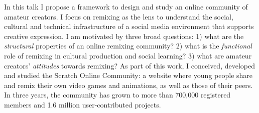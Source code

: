


\setcounter{savepage}{\thepage}
\begin{abstractpage}
\setlength{\parskip}{0pt} %
\begin{spacing}{1}
In this talk I propose a framework to design and study an online community of amateur creators.
I focus on remixing as the lens to understand the social, cultural and technical infrastructure of a social media environment that supports creative expression.
I am motivated by three broad questions:
1) what are the \emph{structural} properties of an online remixing community?
2) what is the \emph{functional} role of remixing in cultural production and social learning?
3) what are amateur creators' \emph{attitudes} towards remixing?
As part of this work, I conceived, developed and studied the Scratch Online Community: a website where young people share and remix their own video games and animations, as well as those of their peers.
In three years, the community has grown to more than 700,000 registered members and 1.6 million user-contributed projects.
\end{spacing}
\setlength{\parskip}{11pt plus3pt minus3pt} %
\end{abstractpage}

